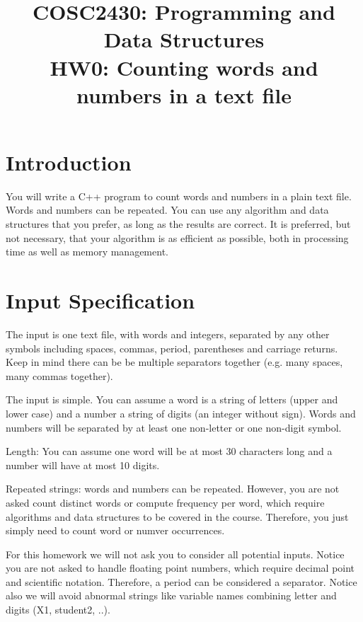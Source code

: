 

\title{COSC2430: Programming and Data Structures\\
HW0: Counting words and numbers in a text file
}

\date{}



\pagestyle{plain}
\let\thepage\relax  %

\maketitle

\section{Introduction}

You will write a C++ program to count words and numbers in a plain text file.
Words and numbers can be repeated.
You can use any algorithm and data structures that you prefer, as long as the results are correct. It is preferred, but not necessary, that your algorithm is as efficient as possible, both in processing time as well as memory management. 

\section{Input Specification}

The input is one text file, with words and integers, separated by any other symbols including
spaces, commas, period, parentheses and carriage returns.
Keep in mind there can be be multiple separators together (e.g. many spaces, many commas together).

The input is simple.
You can assume a word is a string of letters (upper and lower case) and a number a string of digits (an integer
without sign). Words and numbers will be separated by at least one non-letter or one non-digit symbol.

Length: You can assume one word will be at most 30 characters long
and a number will have at most 10 digits.

Repeated strings: words and numbers can be repeated. However, you are not asked count distinct words
or compute frequency per word, which require algorithms and data structures to be covered in the course.
Therefore, you just simply need to count word or numver occurrences.

For this homework we will not ask you to consider all potential inputs.
Notice you are not asked to handle floating point numbers, which require decimal point
and scientific notation. Therefore, a period can be considered a separator.
%
Notice also we will avoid abnormal strings like variable names combining letter and digits 
(X1, student2, ..).


